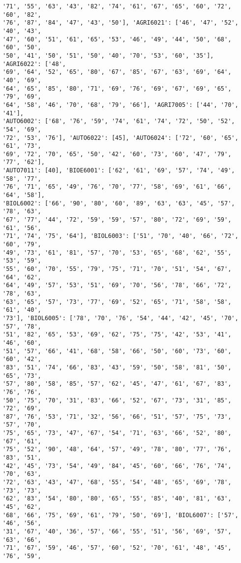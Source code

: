 \documentclass[11pt]{article}
\begin{document}
\begin{Verbatim}[commandchars=\\\{\}]
'71', '55', '63', '43', '82', '74', '61', '67', '65', '60', '72', '60', '82',
'76', '87', '84', '47', '43', '50'], 'AGRI6021': ['46', '47', '52', '40', '43',
'47', '60', '51', '61', '65', '53', '46', '49', '44', '50', '68', '60', '50',
'50', '41', '50', '51', '50', '40', '70', '53', '60', '35'], 'AGRI6022': ['48',
'69', '64', '52', '65', '80', '67', '85', '67', '63', '69', '64', '40', '69',
'64', '65', '85', '80', '71', '69', '76', '69', '67', '69', '65', '79', '69',
'64', '58', '46', '70', '68', '79', '66'], 'AGRI7005': ['44', '70', '41'],
'AUTO6002': ['68', '76', '59', '74', '61', '74', '72', '50', '52', '54', '69',
'72', '53', '76'], 'AUTO6022': [45], 'AUTO6024': ['72', '60', '65', '61', '73',
'69', '72', '70', '65', '50', '42', '60', '73', '60', '47', '79', '77', '62'],
'AUTO7011': [40], 'BIOE6001': ['62', '61', '69', '57', '74', '49', '58', '77',
'76', '71', '65', '49', '76', '70', '77', '58', '69', '61', '66', '64', '58'],
'BIOL6002': ['66', '90', '80', '60', '89', '63', '63', '45', '57', '78', '63',
'67', '77', '44', '72', '59', '59', '57', '80', '72', '69', '59', '61', '56',
'71', '74', '75', '64'], 'BIOL6003': ['51', '70', '40', '66', '72', '60', '79',
'49', '73', '61', '81', '57', '70', '53', '65', '68', '62', '55', '53', '59',
'55', '60', '70', '55', '79', '75', '71', '70', '51', '54', '67', '64', '62',
'64', '49', '57', '53', '51', '69', '70', '56', '78', '66', '72', '78', '63',
'63', '65', '57', '73', '77', '69', '52', '65', '71', '58', '58', '61', '40',
'73'], 'BIOL6005': ['78', '70', '76', '54', '44', '42', '45', '70', '57', '78',
'51', '82', '65', '53', '69', '62', '75', '75', '42', '53', '41', '46', '60',
'51', '57', '66', '41', '68', '58', '66', '50', '60', '73', '60', '60', '42',
'83', '51', '74', '66', '83', '43', '59', '50', '58', '81', '50', '65', '73',
'57', '80', '58', '85', '57', '62', '45', '47', '61', '67', '83', '76', '76',
'50', '75', '70', '31', '83', '66', '52', '67', '73', '31', '85', '72', '69',
'87', '76', '53', '71', '32', '56', '66', '51', '57', '75', '73', '57', '70',
'75', '65', '73', '47', '67', '54', '71', '63', '66', '52', '80', '67', '61',
'75', '52', '90', '48', '64', '57', '49', '78', '80', '77', '76', '83', '51',
'42', '45', '73', '54', '49', '84', '45', '60', '66', '76', '74', '70', '63',
'72', '63', '43', '47', '68', '55', '54', '48', '65', '69', '78', '73', '73',
'62', '83', '54', '80', '80', '65', '55', '85', '40', '81', '63', '45', '62',
'68', '66', '75', '69', '61', '79', '50', '69'], 'BIOL6007': ['57', '46', '56',
'31', '67', '40', '36', '57', '66', '55', '51', '56', '69', '57', '63', '66',
'71', '67', '59', '46', '57', '60', '52', '70', '61', '48', '45', '76', '59',

\end{Verbatim}
\end{document}

